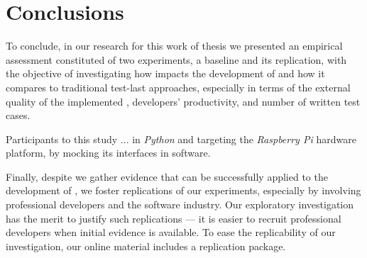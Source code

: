 \chapter{Conclusions}
\label{chap:7_conclusions}
To conclude, in our research for this work of thesis we presented an empirical assessment constituted of two experiments, a baseline and its replication, with the objective of investigating how \tdd impacts the development of \ess and how it compares to traditional test-last approaches, especially in terms of the external quality of the implemented \es, developers' productivity, and number of written test cases.

Participants to this study ... in \textit{Python} and targeting the \textit{Raspberry Pi} hardware platform, by mocking its interfaces in software.


Finally, despite we gather evidence that \tdd can be successfully applied to the development of \ess, we foster replications of our experiments, especially by involving professional developers and the software industry. Our exploratory investigation has the merit to justify such replications — it is easier to recruit professional developers when initial evidence is available. To ease the replicability of our investigation, our online material includes a replication package.